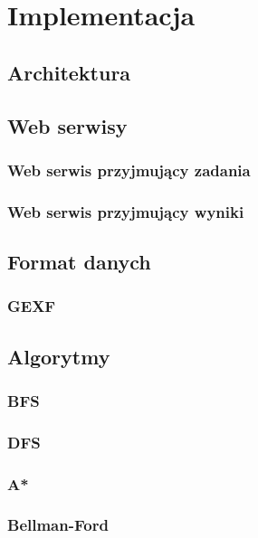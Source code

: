 \chapter{Implementacja}

\section{Architektura}

\section{Web serwisy}
\subsection{Web serwis przyjmujący zadania}

\subsection{Web serwis przyjmujący wyniki}

\section{Format danych}

\subsection{GEXF}

\section{Algorytmy}

\subsection{BFS}

\subsection{DFS}

\subsection{A*}

\subsection{Bellman-Ford}


